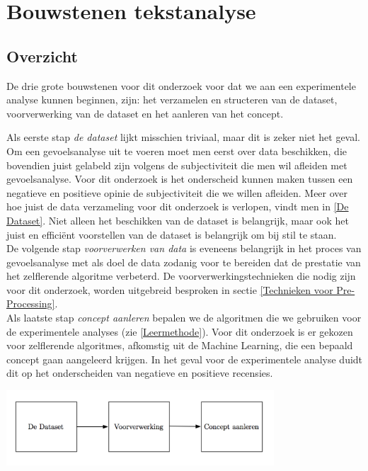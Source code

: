 \chapter{Bouwstenen tekstanalyse}\label{Lectuur}

\section{Overzicht}\label{Overzicht}

 De drie grote bouwstenen voor dit onderzoek voor dat we aan een experimentele analyse kunnen beginnen, zijn: het verzamelen en structeren van de dataset, voorverwerking van de dataset en het aanleren van het concept.

Als eerste stap \textit{de dataset} lijkt misschien triviaal, maar dit is zeker niet het geval. Om een gevoelsanalyse uit te voeren moet men eerst over data beschikken, die bovendien juist gelabeld zijn volgens de subjectiviteit die men wil afleiden met gevoelsanalyse. Voor dit onderzoek is het onderscheid kunnen maken tussen een negatieve en positieve opinie de subjectiviteit die we willen afleiden. Meer over hoe juist de data verzameling voor dit onderzoek is verlopen, vindt men in \ref{De Dataset}. Niet alleen het beschikken van de dataset is belangrijk, maar ook het juist en effici\"ent voorstellen van de dataset is belangrijk om bij stil te staan.\\

De volgende stap \textit{voorverwerken van data}  is eveneens belangrijk in het proces van gevoelsanalyse met als doel de data zodanig voor te bereiden dat de prestatie van het zelflerende algoritme verbeterd. De voorverwerkingstechnieken die nodig zijn voor dit onderzoek, worden uitgebreid besproken in sectie \ref{Technieken voor Pre-Processing}.\\

Als laatste stap \textit{concept aanleren} bepalen we de algoritmen die we gebruiken voor de experimentele analyses (zie \ref{Leermethode}). Voor dit onderzoek is  er gekozen voor zelflerende algoritmes, afkomstig uit de Machine Learning, die een bepaald concept gaan aangeleerd krijgen. In het geval voor de experimentele analyse duidt dit op het onderscheiden van negatieve en positieve recensies.

\begin{center}
  \includegraphics[width=10cm]{overzicht}
  \label{fig:beslissingsboom}
\end{center}


